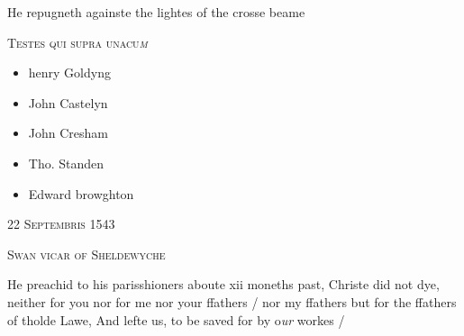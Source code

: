 \documentclass[12pt, a4paper]{book}
\begin{document}
		\ifthenelse{\isodd{\thepage}}
		{\reversemarginpar}
		{\normalmarginpar}
		He repugneth againste the lightes of the crosse beame
               	

	
				\begin{center}  {\scshape Testes qui supra unacu\textit{m}}  \end{center}
			
               	
               	\begin{itemize}
               		\item[]henry Goldyng
               		\item[]John Castelyn
               	\end{itemize}
               	\begin{itemize}
               		\item[]John Cresham
               		\item[]Tho. Standen
               		\item[]Edward browghton
               	\end{itemize}
 
				\marginpar[\vspace{0.5cm}{\textcolor{Gray}{n}}]{}
			

            
            
               
				\begin{center} \begin{large} {\scshape 
                  22 Septembris 1543
               } \end{large} \end{center}
			
               
               	
				\begin{center}  {\scshape Swan vicar of Sheldewyche}  \end{center}
			
               	
               		
				\marginpar[\vspace{0.5cm}{\textcolor{Gray}{herecie}}]{}
			
               		
		\ifthenelse{\isodd{\thepage}}
		{\reversemarginpar}
		{\normalmarginpar}
		He preachid to his parisshioners aboute xii moneths
  past, Christe did not dye, neither for you nor for me
 nor your ffathers / nor my ffathers but for the
 ffathers of tholde Lawe, And lefte us, to be saved for
 by o\textit{ur} workes /
 
\end{document}
